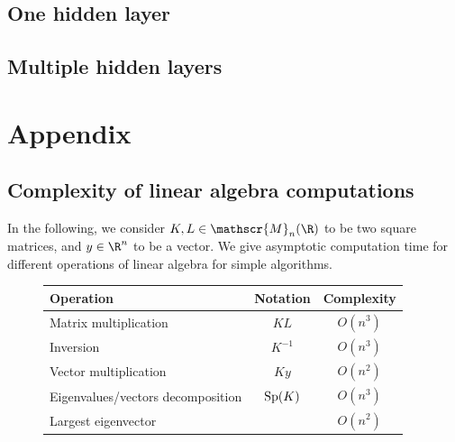 \documentclass[toc, titlepaged]{../cs-classes/cs-classes}
\begin{document}
\subsection{One hidden layer}

\subsection{Multiple hidden layers}

\section{Appendix}
\subsection{Complexity of linear algebra computations}
In the following, we consider $K, L\in\mathscr{M}_n(\R)$ to be two square matrices, and $y\in\R^n$ to be a vector. We give asymptotic computation time for different operations of linear algebra for simple algorithms.

\begin{figure}[H]
    \centering
    \begin{tabular}{|l|c|c|}
        \hline
        \bf Operation & \bf Notation & \bf Complexity\\
        \hline\hline
        Matrix multiplication & $KL$ & $O(n^3)$\\\hline
        Inversion & $K^{-1}$ & $O(n^3)$\\\hline
        Vector multiplication & $Ky$ & $O(n^2)$\\\hline
        Eigenvalues/vectors decomposition & $\textnormal{Sp}(K)$ & $O(n^3)$\\\hline
        Largest eigenvector & & $O(n^2)$\\\hline
    \end{tabular}
\end{figure}
\end{document}
